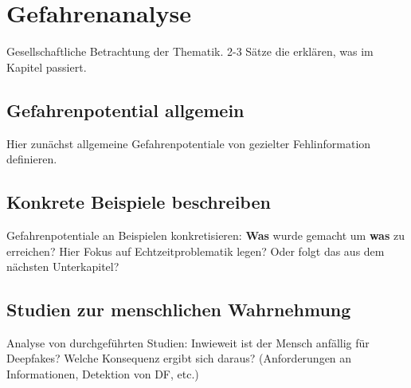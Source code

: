 \section{Gefahrenanalyse}
Gesellschaftliche Betrachtung der Thematik.
2-3 Sätze die erklären, was im Kapitel passiert.
\subsection{Gefahrenpotential allgemein}
Hier zunächst allgemeine Gefahrenpotentiale von gezielter Fehlinformation definieren.
\subsection{Konkrete Beispiele beschreiben}
Gefahrenpotentiale an Beispielen konkretisieren: \textbf{Was} wurde gemacht um \textbf{was} zu erreichen?
Hier Fokus auf Echtzeitproblematik legen? Oder folgt das aus dem nächsten Unterkapitel?
\subsection{Studien zur menschlichen Wahrnehmung}
Analyse von durchgeführten Studien: Inwieweit ist der Mensch anfällig für Deepfakes?
Welche Konsequenz ergibt sich daraus? (Anforderungen an Informationen, Detektion von DF, etc.)